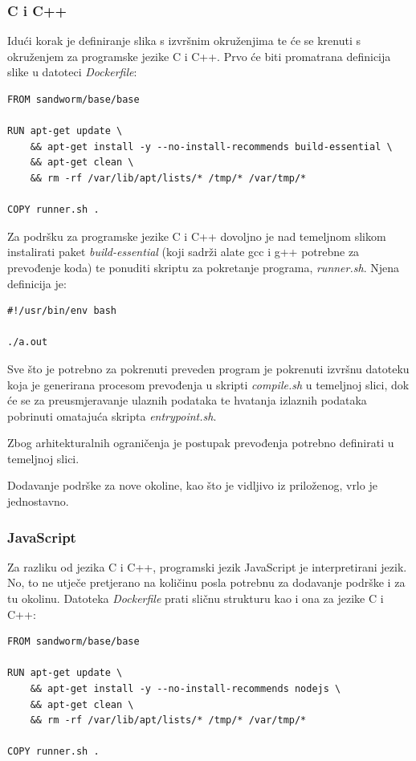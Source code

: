 \documentclass[times, utf8, zavrsni]{fer}
\begin{document}
\subsubsection{C i C++}

Idući korak je definiranje slika s izvršnim okruženjima te će se krenuti s okruženjem za programske jezike C i C++. Prvo će biti promatrana definicija slike u datoteci {\textit{Dockerfile}}:

\begin{lstlisting}
FROM sandworm/base/base

RUN apt-get update \
    && apt-get install -y --no-install-recommends build-essential \
    && apt-get clean \
    && rm -rf /var/lib/apt/lists/* /tmp/* /var/tmp/*

COPY runner.sh .
\end{lstlisting}

Za podršku za programske jezike C i C++ dovoljno je nad temeljnom slikom instalirati paket {\textit{build-essential}} (koji sadrži alate gcc i g++ potrebne za prevođenje koda) te ponuditi skriptu za pokretanje programa, {\textit{runner.sh}}. Njena definicija je:

\begin{lstlisting}
#!/usr/bin/env bash

./a.out
\end{lstlisting}

Sve što je potrebno za pokrenuti preveden program je pokrenuti izvršnu datoteku koja je generirana procesom prevođenja u skripti {\textit{compile.sh}} u temeljnoj slici, dok će se za preusmjeravanje ulaznih podataka te hvatanja izlaznih podataka pobrinuti omatajuća skripta {\textit{entrypoint.sh}}.

Zbog arhitekturalnih ograničenja je postupak prevođenja potrebno definirati u temeljnoj slici. 

Dodavanje podrške za nove okoline, kao što je vidljivo iz priloženog, vrlo je jednostavno.

\subsubsection{JavaScript}

Za razliku od jezika C i C++, programski jezik JavaScript je interpretirani jezik. No, to ne utječe pretjerano na količinu posla potrebnu za dodavanje podrške i za tu okolinu. Datoteka {\textit{Dockerfile}} prati sličnu strukturu kao i ona za jezike C i C++:

\begin{lstlisting}
FROM sandworm/base/base

RUN apt-get update \
    && apt-get install -y --no-install-recommends nodejs \
    && apt-get clean \
    && rm -rf /var/lib/apt/lists/* /tmp/* /var/tmp/*

COPY runner.sh .
\end{lstlisting}
\end{document}
